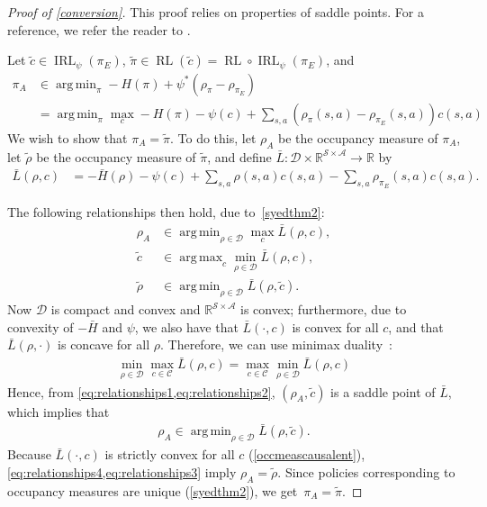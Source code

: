 \documentclass{article}
\newcommand\bbR{\ensuremath{\mathbb{R}}} %
\newcommand\allC{\ensuremath{\mathbb{R}^{\mathcal{S}\times\mathcal{A}}}}
\DeclareMathOperator*{\argmax}{arg\,max}
\DeclareMathOperator*{\argmin}{arg\,min}
\newcommand{\1}{\mathbb{I}} %
\DeclareMathOperator{\rl}{RL}
\DeclareMathOperator{\irl}{IRL} %
\begin{document}
\begin{proof}[Proof of \cref{conversion}]
This proof relies on properties of saddle points. For a reference, we refer the reader to \citet[section VII.4]{hiriart1996convex}.

Let $\tilde c \in \irl_{\psi}(\pi_E)$, $\tilde \pi \in \rl(\tilde c) = \rl\circ\irl_\psi(\pi_E)$, and
\begin{align}
\pi_A &\in \argmin_\pi -H(\pi) + \psi^*(\rho_\pi - \rho_{\pi_E}) \\
&=\argmin_\pi \max_c -H(\pi)  -\psi(c) + \sum_{s,a}(\rho_\pi(s,a) - \rho_{\pi_E}(s,a))c(s,a)
\end{align}
We wish to show that $\pi_A = \tilde \pi$. To do this, let $\rho_A$ be the occupancy measure of $\pi_A$, let $\tilde \rho$ be the occupancy measure of $\tilde \pi$, and define $\bar L : \mathcal{D} \times \allC \rightarrow \bbR$ by
\begin{align}
\bar L(\rho,c) &= -\bar H(\rho) -\psi(c) + \sum_{s,a}\rho(s,a)c(s,a) - \sum_{s,a}\rho_{\pi_E}(s,a)c(s,a).
\end{align}

The following relationships then hold, due to~\cref{syedthm2}:
\begin{align}
\rho_A &\in \argmin_{\rho\in\mathcal{D}} \max_c \bar L(\rho, c), \label{eq:relationships1} \\
\tilde c &\in \argmax_c \min_{\rho\in\mathcal{D}} \bar L(\rho, c), \label{eq:relationships2} \\
\tilde \rho &\in \argmin_{\rho\in\mathcal{D}} \bar L(\rho, \tilde c). \label{eq:relationships3}
\end{align}
Now $\mathcal{D}$ is compact and convex and $\allC$ is convex; furthermore, due to convexity of $-\bar H$ and $\psi$, we also have that $\bar L(\cdot,c)$ is convex for all $c$, and that $\bar L(\rho, \cdot)$ is concave for all $\rho$. Therefore, we can use minimax duality~\citep{millar1983minimax}:
\begin{align}
\min_{\rho\in\mathcal{D}} \max_{c\in\mathcal{C}} \bar L(\rho, c) =  \max_{c\in\mathcal{C}}\min_{\rho\in\mathcal{D}} \bar L(\rho,c)
\end{align}
Hence, from \cref{eq:relationships1,eq:relationships2}, $(\rho_A, \tilde c)$ is a saddle point of $\bar L$, which implies that
\begin{align}
\rho_A \in \argmin_{\rho\in\mathcal{D}} \bar L(\rho, \tilde c). \label{eq:relationships4}
\end{align}
Because $\bar L(\cdot, c)$ is strictly convex for all $c$ (\cref{occmeascausalent}), \cref{eq:relationships4,eq:relationships3} imply $\rho_A = \tilde \rho$. Since policies corresponding to occupancy measures are unique (\cref{syedthm2}), we get~$\pi_A = \tilde \pi$.
\end{proof}
\end{document}
